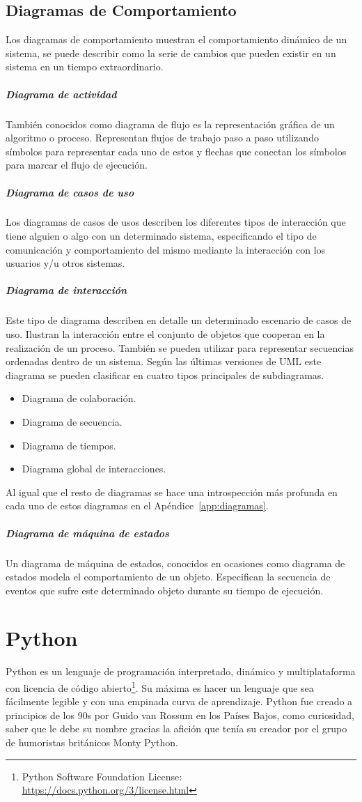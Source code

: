 \documentclass[a4paper, 12pt]{book}
\begin{document}
\subsection{Diagramas de Comportamiento}
Los diagramas de comportamiento muestran el comportamiento dinámico de un sistema, se puede describir como la serie de cambios que pueden existir en un sistema en un tiempo extraordinario.  
\subparagraph{Diagrama de actividad}
También conocidos como diagrama de flujo es la representación gráfica de un algoritmo o proceso. Representan flujos de trabajo paso a paso utilizando símbolos para representar cada uno de estos y flechas que conectan los símbolos para marcar el flujo de ejecución. 
\subparagraph{Diagrama de casos de uso}
Los diagramas de casos de usos describen los diferentes tipos de interacción que tiene alguien o algo con un determinado sistema, especificando el tipo de comunicación y comportamiento del mismo mediante la interacción con los usuarios y/u otros sistemas.
\subparagraph{Diagrama de interacción}
Este tipo de diagrama describen en detalle un determinado escenario de casos de uso. Ilustran la interacción entre el conjunto de objetos que cooperan en la realización de un proceso. También se pueden utilizar para representar secuencias ordenadas dentro de un sistema. Según las últimas versiones  de UML este diagrama se pueden clasificar en cuatro tipos principales de subdiagramas. 
\begin{itemize}
	\item Diagrama de colaboración. 
	\item Diagrama de secuencia. 
	\item Diagrama de tiempos. 
	\item Diagrama global de interacciones.  
\end{itemize}
Al igual que el resto de diagramas se hace una introspección más profunda en cada uno de estos diagramas en el Apéndice~\ref{app:diagramas}.
\subparagraph{Diagrama de máquina de estados}
Un diagrama de máquina de estados, conocidos en ocasiones como diagrama de estados modela el comportamiento de un objeto. Especifican la secuencia de eventos que sufre este determinado objeto durante su tiempo de ejecución. 

\section{Python}
Python es un lenguaje de programación interpretado, dinámico y multiplataforma con licencia de código abierto\footnote{Python Software Foundation License: \url{https://docs.python.org/3/license.html}}. Su máxima es hacer un lenguaje que sea fácilmente legible y con una empinada curva de aprendizaje. Python fue creado a principios de los 90s por Guido van Rossum en los Países Bajos, como curiosidad, saber que le debe su nombre gracias la afición que tenía su creador por el grupo de humoristas británicos Monty Python. 
\end{document}
